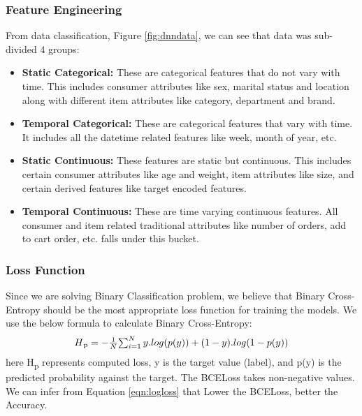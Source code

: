 \subsubsection{Feature Engineering}
From data classification, Figure \ref{fig:dnndata}, we can see that data was sub-divided 4 groups:
\begin{itemize}
\item {\bf Static Categorical:} These are categorical features that do not vary with time. This includes consumer
attributes like sex, marital status and location along with different item attributes like category, department and brand.
\item {\bf Temporal Categorical:} These are categorical features that vary with time. It includes all the datetime 
related features like week, month of year, etc.
\item {\bf Static Continuous:} These features are static but continuous. This includes certain consumer attributes like
age and weight, item attributes like size, and certain derived features like target encoded features.
\item {\bf Temporal Continuous:} These are time varying continuous features. All consumer and item related
traditional attributes like number of orders, add to cart order, etc. falls under this bucket.
\end{itemize}
\subsubsection{Loss Function}
Since we are solving Binary Classification problem, we believe that Binary Cross-Entropy should be the most appropriate 
loss function for training the models. We use the below formula to calculate Binary Cross-Entropy:
  \begin{equation}
      \begin{array}{l}
        H\textsubscript{p} = - \frac{1}{N}$$\sum_{i=1}^{N}y.log(p(y))+
        (1- y).log(1-p(y))
      \end{array}
    \label{eqn:logloss}
  \end{equation}
here H\textsubscript{p} represents computed loss, y is the target value (label), and p(y) 
is the predicted probability against the target. The BCELoss takes non-negative values. We can infer 
from Equation \ref{eqn:logloss} that Lower the BCELoss, better the Accuracy.
